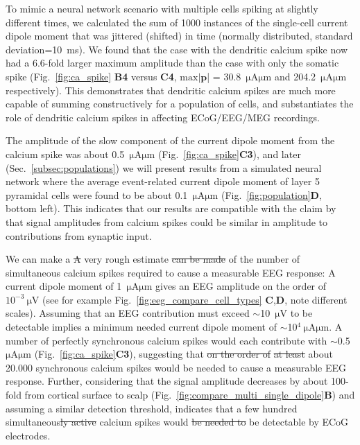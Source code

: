 \documentclass[preprint,10pt,authoryear]{elsarticle}
\newcommand{\hlg}[2][Emerald]{ {\sethlcolor{#1} \hl{#2}} }
\newcommand{\sntxt}[1]{{\color{NavyBlue}#1}}
\newcommand{\tvnnote}[1]{\color{white}{\hlg{TVN: #1 }}\color{black}}
\newcommand{\tvntxt}[1]{{\color{Emerald}#1}}
\newcommand{\gex}[1]{{\color{Orange}#1}}
\begin{document}
To mimic a neural network scenario with multiple cells spiking at slightly different times, we calculated the sum of 1000 instances of the single-cell current dipole moment that was jittered (shifted) in time (normally distributed, standard deviation=10~ms).
We found that the case with the dendritic calcium spike now had a $6.6$-fold larger maximum amplitude than the case with
only the somatic spike (Fig.~\ref{fig:ca_spike} \textbf{B4} versus \textbf{C4}, 
$\mathrm{max}|\mathbf{p}$| = 30.8~$\si{\uA}\si{\um}$ and 204.2~$\si{\uA}\si{\um}$ respectively).
This demonstrates that dendritic calcium spikes are much more capable of summing constructively for a population of cells, and substantiates the role of dendritic calcium spikes in affecting ECoG/EEG/MEG recordings. 

The amplitude of the slow component of the current dipole moment from the calcium spike was about 0.5~$\si{\uA}\si{\um}$ (Fig.~\ref{fig:ca_spike}\textbf{C3}), and later (Sec.~\ref{subsec:populations}) we will present results from a simulated neural network where the average event-related current dipole moment of layer 5 pyramidal cells were found to be about 0.1~$\si{\uA}\si{\um}$ (Fig.~\ref{fig:population}{\bf D}, bottom left). This indicates that our results are compatible with the claim by \cite{SUZUKI2017} that signal amplitudes from calcium spikes could be similar in amplitude to contributions from synaptic input.

\tvntxt{
\sntxt{We can make a \sout{A}} very rough estimate \sntxt{\sout{can be made}} of the number of simultaneous calcium spikes required to cause a measurable EEG response: 
A current dipole moment of 1~$\si{\uA}\si{\um}$ gives an EEG amplitude on the order of $10^{-3}~\si{\uV}$ (see for example Fig.~\ref{fig:eeg_compare_cell_types} \textbf{C},\textbf{D}, note different scales).
Assuming that an EEG contribution must exceed $\sim$10~$\si{\uV}$ to be detectable \citep{NUNEZ2006, HAGEN2018} implies a minimum needed current dipole moment of 
$\sim$10$^4~\si{\uA}\si{\um}$. A number of perfectly synchronous calcium spikes would each contribute with $\sim$0.5~$\si{\uA}\si{\um}$ (Fig.~\ref{fig:ca_spike}\textbf{C3}), suggesting that \sntxt{\sout{on the order of}} \gex{\sout{at least} about 20.000} \sntxt{synchronous} calcium spikes would be needed to cause a measurable EEG response. Further, considering that the signal amplitude decreases by about 100-fold from cortical surface to scalp (Fig.~\ref{fig:compare_multi_single_dipole}\textbf{B}) and assuming a similar detection threshold, indicates that a few hundred simultaneous\sntxt{\sout{ly active}} calcium spikes would \sntxt{\sout{be needed to}} be detectable by ECoG electrodes.
}
\end{document}
